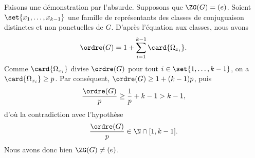 Faisons une démonstration par l'absurde.
Supposons que $\ZG(G) = (e)$.
Soient $\set{x_1,\dots,x_{k - 1}}$ une famille de représentants des classes de conjuguaison distinctes et non ponctuelles de $G$.
D'après l'équation aux classes, nous avons
\[
  \ordre(G) = 1 + \sum_{i = 1}^{k - 1} \card{\Omega_{x_i}}.
\]
Comme $\card{\Omega_{x_i}}$ divise $\ordre(G)$ pour tout $i\in\set{1,\dots,k - 1}$, on a $\card{\Omega_{x_i}} \geq p$.
Par conséquent, $\ordre(G) \geq 1 + (k - 1)p$, puis
\[
  \frac{\ordre(G)}{p} \geq \frac{1}{p} + k - 1 > k - 1,
\]
d'où la contradiction avec l'hypothèse
\[
  \frac{\ordre(G)}{p} \in \N \cap [1,k-1].
\]
Nous avons donc bien $\ZG(G) \neq (e)$.
